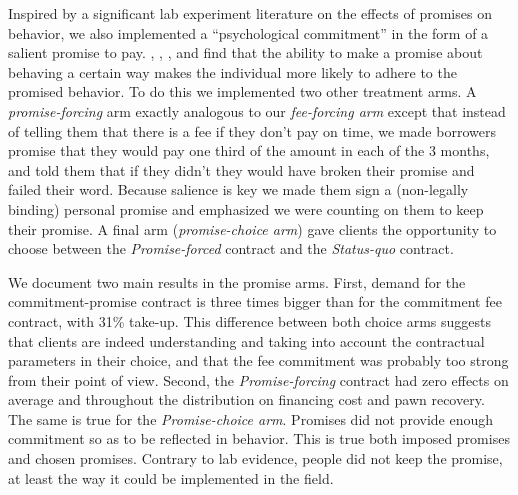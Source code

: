 \documentclass[11pt]{article}
\begin{document}
Inspired by a significant lab experiment literature on the effects of promises on behavior, we also implemented a ``psychological commitment'' in the form of a salient promise to pay.  \cite{PromisesPartnerships}, \cite{FurtherPromises}, \cite{Vanberg}, and \cite{Ismayilov2017} find that the ability to make a promise about behaving a certain way makes the individual more likely to adhere to the promised behavior. %
To do this we implemented two other treatment arms. A \textit{promise-forcing} arm exactly analogous to our \textit{fee-forcing arm} except that instead of telling them that there is a fee if they don't pay on time, we made borrowers promise that they would pay one third of the amount in each of the 3 months, and told them that if they didn't they would have broken their promise and failed their word. Because salience is key we made them sign a (non-legally binding) personal promise and emphasized we were counting on them to keep their promise. A final arm (\textit{promise-choice arm}) gave clients the opportunity to choose between the \textit{Promise-forced} contract and the \textit{Status-quo} contract.

We document two main results in the promise arms. First, demand for the commitment-promise contract is three times bigger than for the commitment fee contract, with 31\% take-up. This difference between both choice arms suggests that clients are indeed understanding and taking into account the contractual parameters in their choice, and that the fee commitment was probably too strong from their point of view. Second, the \textit{Promise-forcing} contract had zero effects on average and throughout the distribution on financing cost and pawn recovery. The same is true for the \textit{Promise-choice arm}. %
Promises did not provide enough commitment so as to be reflected in behavior. This is true both imposed promises and chosen promises. Contrary to lab evidence, people did not keep the promise, at least the way it could be implemented in the field.
\end{document}

